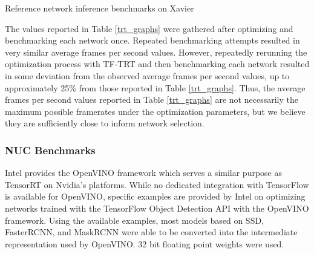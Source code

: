 \begin{table}
	\centering
	\begin{adjustbox}{max width=.95\textwidth}
	\end{adjustbox}
	\caption{Reference network inference benchmarks on Xavier}
	\label{reference_graphs}
\end{table}

The values reported in Table \ref{trt_graphs} were gathered after optimizing and benchmarking each network once. Repeated benchmarking attempts resulted in very similar average frames per second values. However, repeatedly rerunning the optimization process with TF-TRT and then benchmarking each network resulted in some deviation from the observed average frames per second values, up to approximately 25\% from those reported in Table \ref{trt_graphs}. Thus, the average frames per second values reported in Table \ref{trt_graphs} are not necessarily the maximum possible framerates under the optimization parameters, but we believe they are sufficiently close to inform network selection.

\subsubsection{NUC Benchmarks}

Intel provides the OpenVINO framework which serves a similar purpose as TensorRT on Nvidia's platforms. While no dedicated integration with TensorFlow is available for OpenVINO, specific examples are provided by Intel on optimizing networks trained with the TensorFlow Object Detection API with the OpenVINO framework. Using the available examples, most models based on SSD, FasterRCNN, and MaskRCNN were able to be converted into the intermediate representation used by OpenVINO. 32 bit floating point weights were used.

